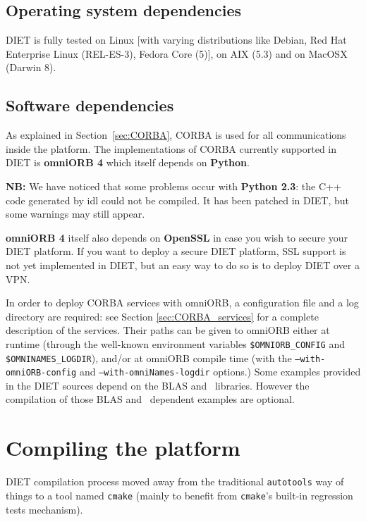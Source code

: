 \subsection{Operating system dependencies}
DIET is fully tested on Linux [with varying distributions like Debian,
Red Hat Enterprise Linux (REL-ES-3), Fedora Core (5)], on AIX (5.3) and on MacOSX
(Darwin 8).

\subsection{Software dependencies}
\label{sec:software_dependencies}

As explained in Section~\ref{sec:CORBA}, CORBA is used for all
communications inside the platform.
The implementations of CORBA currently supported in DIET is
\textbf{omniORB 4} which itself depends on \textbf{Python}.

\noindent 
\textbf{NB:} We have noticed that some problems occur with
\textbf{Python 2.3}: the C++ code generated by idl could not be compiled.
It has been patched in DIET, but some warnings may still appear.

\textbf{omniORB 4} itself also depends on \textbf{OpenSSL} in case
you wish to secure your DIET platform.
If you want to deploy a secure DIET platform, SSL support is not yet
implemented  in DIET, but an easy way to do so is to deploy DIET over
a VPN.

In order to deploy CORBA services with omniORB, a configuration file
and a log directory are required: see Section \ref{sec:CORBA_services}
for a complete description of the services.  Their paths can be given
to omniORB either at runtime (through the well-known environment
variables \texttt{\$OMNIORB\_CONFIG} and 
\texttt{\$OMNINAMES\_LOGDIR}), and/or at omniORB compile time (with 
the \linebreak\texttt{--with-omniORB-config} and \texttt{--with-omniNames-logdir} options.)
Some examples provided in the DIET sources depend on the BLAS
and \scalapack\ libraries. However the compilation of those BLAS and
\scalapack\ dependent examples are optional.

\section{Compiling the platform}
\label{sec:compil_platform}

DIET compilation process moved away from the traditional \verb+autotools+
way of things to a tool named \verb+cmake+ (mainly to benefit from
\verb+cmake+'s built-in regression tests mechanism).

